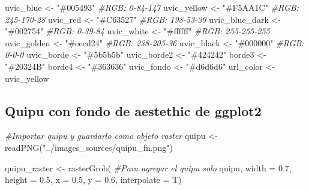\documentclass[
]{article}
\newenvironment{Shaded}{\begin{snugshade}}{\end{snugshade}}
\newcommand{\AttributeTok}[1]{\textcolor[rgb]{0.77,0.63,0.00}{#1}}
\newcommand{\CommentTok}[1]{\textcolor[rgb]{0.56,0.35,0.01}{\textit{#1}}}
\newcommand{\FloatTok}[1]{\textcolor[rgb]{0.00,0.00,0.81}{#1}}
\newcommand{\FunctionTok}[1]{\textcolor[rgb]{0.00,0.00,0.00}{#1}}
\newcommand{\NormalTok}[1]{#1}
\newcommand{\OtherTok}[1]{\textcolor[rgb]{0.56,0.35,0.01}{#1}}
\newcommand{\StringTok}[1]{\textcolor[rgb]{0.31,0.60,0.02}{#1}}
\begin{document}
\begin{Shaded}
\begin{Highlighting}[]
\NormalTok{uvic\_blue      }\OtherTok{\textless{}{-}} \StringTok{"\#005493"}    \CommentTok{\#RGB: 0{-}84{-}147}
\NormalTok{uvic\_yellow    }\OtherTok{\textless{}{-}} \StringTok{"\#F5AA1C"}    \CommentTok{\#RGB: 245{-}170{-}28  }
\NormalTok{uvic\_red       }\OtherTok{\textless{}{-}} \StringTok{"\#C63527"}    \CommentTok{\#RGB: 198{-}53{-}39}
\NormalTok{uvic\_blue\_dark }\OtherTok{\textless{}{-}} \StringTok{"\#002754"}  \CommentTok{\#RGB: 0{-}39{-}84}
\NormalTok{uvic\_white     }\OtherTok{\textless{}{-}} \StringTok{"\#ffffff"} \CommentTok{\#RGB: 255{-}255{-}255}
\NormalTok{uvic\_golden    }\OtherTok{\textless{}{-}} \StringTok{"\#eecd24"} \CommentTok{\#RGB: 238{-}205{-}36}
\NormalTok{uvic\_black     }\OtherTok{\textless{}{-}} \StringTok{"\#000000"} \CommentTok{\#RGB: 0{-}0{-}0}
\NormalTok{uvic\_borde     }\OtherTok{\textless{}{-}} \StringTok{"\#5b5b5b"}
\NormalTok{uvic\_borde2    }\OtherTok{\textless{}{-}} \StringTok{"\#424242"}
\NormalTok{borde3         }\OtherTok{\textless{}{-}} \StringTok{"\#20324B"}
\NormalTok{borde4         }\OtherTok{\textless{}{-}} \StringTok{"\#363636"}
\NormalTok{uvic\_fondo     }\OtherTok{\textless{}{-}} \StringTok{"\#d6d6d6"}
\NormalTok{url\_color      }\OtherTok{\textless{}{-}}\NormalTok{ uvic\_yellow}
\end{Highlighting}
\end{Shaded}

\hypertarget{quipu-con-fondo-de-aestethic-de-ggplot2}{%
\subsection{Quipu con fondo de aestethic de
ggplot2}\label{quipu-con-fondo-de-aestethic-de-ggplot2}}

\begin{Shaded}
\begin{Highlighting}[]
\CommentTok{\#Importar quipu y guardarlo como objeto raster}
\NormalTok{quipu }\OtherTok{\textless{}{-}} \FunctionTok{readPNG}\NormalTok{(}\StringTok{"../images\_sources/quipu\_fn.png"}\NormalTok{)}

\NormalTok{quipu\_raster }\OtherTok{\textless{}{-}} \FunctionTok{rasterGrob}\NormalTok{(     }\CommentTok{\#Para agregar el quipu solo}
\NormalTok{  quipu, }
  \AttributeTok{width =} \FloatTok{0.7}\NormalTok{,}
  \AttributeTok{height =} \FloatTok{0.5}\NormalTok{, }
  \AttributeTok{x =} \FloatTok{0.5}\NormalTok{, }
  \AttributeTok{y =} \FloatTok{0.6}\NormalTok{,}
  \AttributeTok{interpolate =}\NormalTok{ T)}
\end{Highlighting}
\end{Shaded}
\end{document}
